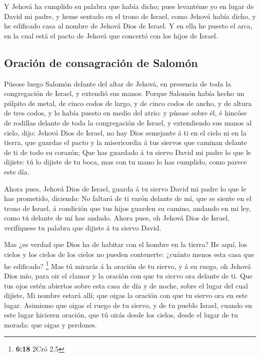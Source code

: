  Y Jehová ha cumplido su palabra que había dicho; pues
levantéme yo en lugar de David mi padre, y heme sentado en el trono de
Israel, como Jehová había dicho, y he edificado casa al nombre de Jehová
Dios de Israel.  Y en ella he puesto el arca, en la cual
está el pacto de Jehová que concertó con los hijos de Israel.

\hypertarget{oraciuxf3n-de-consagraciuxf3n-de-salomuxf3n}{%
\subsection{Oración de consagración de
Salomón}\label{oraciuxf3n-de-consagraciuxf3n-de-salomuxf3n}}

 Púsose luego Salomón delante del altar de Jehová, en
presencia de toda la congregación de Israel, y extendió sus manos.
 Porque Salomón había hecho un púlpito de metal, de cinco
codos de largo, y de cinco codos de ancho, y de altura de tres codos, y
lo había puesto en medio del atrio: y púsose sobre él, é hincóse de
rodillas delante de toda la congregación de Israel, y extendiendo sus
manos al cielo, dijo:  Jehová Dios de Israel, no hay Dios
semejante á ti en el cielo ni en la tierra, que guardas el pacto y la
misericordia á tus siervos que caminan delante de ti de todo su corazón;
 Que has guardado á tu siervo David mi padre lo que le
dijiste: tú lo dijiste de tu boca, mas con tu mano lo has cumplido, como
parece este día.

 Ahora pues, Jehová Dios de Israel, guarda á tu siervo
David mi padre lo que le has prometido, diciendo: No faltará de ti varón
delante de mí, que se siente en el trono de Israel, á condición que tus
hijos guarden su camino, andando en mi ley, como tú delante de mí has
andado.  Ahora pues, oh Jehová Dios de Israel,
verifíquese tu palabra que dijiste á tu siervo David.

 Mas ¿es verdad que Dios ha de habitar con el hombre en
la tierra? He aquí, los cielos y los cielos de los cielos no pueden
contenerte: ¿cuánto menos esta casa que he edificado? \footnote{\textbf{6:18}
  2Cró 2,5}  Mas tú mirarás á la oración de tu siervo, y
á su ruego, oh Jehová Dios mío, para oir el clamor y la oración con que
tu siervo ora delante de ti.  Que tus ojos estén abiertos
sobre esta casa de día y de noche, sobre el lugar del cual dijiste, Mi
nombre estará allí; que oigas la oración con que tu siervo ora en este
lugar.  Asimismo que oigas el ruego de tu siervo, y de tu
pueblo Israel, cuando en este lugar hicieren oración, que tú oirás desde
los cielos, desde el lugar de tu morada: que oigas y perdones.

